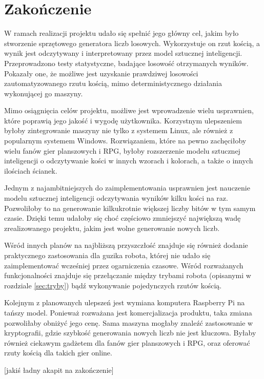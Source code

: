 
\chapter{Zakończenie}\label{ch:zakonczenie}

W ramach realizacji projektu udało się spełnić jego główny cel, jakim było stworzenie sprzętowego generatora liczb losowych.
Wykorzystuje on rzut kością, a wynik jest odczytywany i interpretowany przez model sztucznej inteligencji. Przeprowadzono
testy statystyczne, badające losowość otrzymanych wyników. Pokazały one, że możliwe jest uzyskanie prawdziwej losowości 
zautomatyzowanego rzutu kością, mimo deterministycznego działania wykonującej go maszyny.

Mimo osiągnięcia celów projektu, możliwe jest wprowadzenie wielu usprawnien, które poprawią jego jakość i wygodę użytkownika.
Korzystnym ulepszeniem byłoby zintegrowanie maszyny nie tylko z systemem Linux, ale również z popularnym systemem
Windows. Rozwiązaniem, które na pewno zachęciłoby wielu fanów gier planszowych i RPG, byłoby rozszerzenie modelu 
sztucznej inteligencji o odczytywanie kości w innych wzorach i kolorach, a także o innych ilościach ścianek.

Jednym z najambitniejszych do zaimplementowania usprawnien jest nauczenie modelu sztucznej inteligencji odczytywania 
wyników kilku kości na raz. Pozwoliłoby to na generowanie kilkukrotnie większej liczby bitów w tym samym czasie. Dzięki
temu udałoby się choć częściowo zmniejszyć największą wadę zrealizowanego projektu, jakim jest wolne generowanie nowych
liczb.

Wśród innych planów na najbliższą przyszczłość znajduje się również dodanie praktycznego zastosowania dla guzika robota,
której nie udało się zaimplementować wcześniej przez ogarniczenia czasowe. Wśród rozważanych funkcjonalności znajduje się
przełączanie między trybami robota (opisanymi w rozdziale \ref{sec:tryby}) bądź wykonywanie pojedynczych rzutów kością.

Kolejnym z planowanych ulepszeń jest wymiana komputera Raspberry Pi na tańszy model. Ponieważ rozważana jest komercjalizacja
produktu, taka zmiana pozwoliłaby obniżyć jego cenę. Sama maszyna mogłaby znaleźć zastosowanie w kryptografii, gdzie 
szybkość generowania nowych liczb nie jest kluczowa. Byłaby również ciekawym gadżetem dla fanów gier planszowych i RPG,
oraz oferować rzuty kością dla takich gier online.

[jakiś ładny akapit na zakończenie]